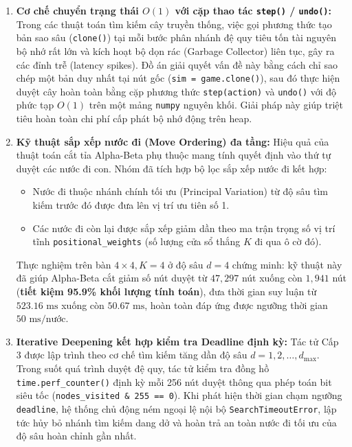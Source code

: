 \documentclass[a4paper,12pt]{report}
\begin{document}
\begin{enumerate}[leftmargin=1.5cm]
    \item \textbf{Cơ chế chuyển trạng thái $O(1)$ với cặp thao tác \texttt{step()} / \texttt{undo()}:}
    Trong các thuật toán tìm kiếm cây truyền thống, việc gọi phương thức tạo bản sao sâu (\texttt{clone()}) tại mỗi bước phân nhánh đệ quy tiêu tốn tài nguyên bộ nhớ rất lớn và kích hoạt bộ dọn rác (Garbage Collector) liên tục, gây ra các đỉnh trễ (latency spikes). Đồ án giải quyết vấn đề này bằng cách chỉ sao chép một bản duy nhất tại nút gốc (\texttt{sim = game.clone()}), sau đó thực hiện duyệt cây hoàn toàn bằng cặp phương thức \texttt{step(action)} và \texttt{undo()} với độ phức tạp $O(1)$ trên một mảng \texttt{numpy} nguyên khối. Giải pháp này giúp triệt tiêu hoàn toàn chi phí cấp phát bộ nhớ động trên heap.

    \item \textbf{Kỹ thuật sắp xếp nước đi (Move Ordering) đa tầng:}
    Hiệu quả của thuật toán cắt tỉa Alpha-Beta phụ thuộc mang tính quyết định vào thứ tự duyệt các nước đi con. Nhóm đã tích hợp bộ lọc sắp xếp nước đi kết hợp:
    \begin{itemize}
        \item Nước đi thuộc nhánh chính tối ưu (Principal Variation) từ độ sâu tìm kiếm trước đó được đưa lên vị trí ưu tiên số 1.
        \item Các nước đi còn lại được sắp xếp giảm dần theo ma trận trọng số vị trí tĩnh \texttt{positional\_weights} (số lượng cửa sổ thắng $K$ đi qua ô cờ đó).
    \end{itemize}
    Thực nghiệm trên bàn $4 \times 4, K=4$ ở độ sâu $d=4$ chứng minh: kỹ thuật này đã giúp Alpha-Beta cắt giảm số nút duyệt từ $47{,}297$ nút xuống còn $1{,}941$ nút (\textbf{tiết kiệm 95.9\% khối lượng tính toán}), đưa thời gian suy luận từ $523.16\text{ ms}$ xuống còn $50.67\text{ ms}$, hoàn toàn đáp ứng được ngưỡng thời gian $50\text{ ms/nước}$.

    \item \textbf{Iterative Deepening kết hợp kiểm tra Deadline định kỳ:}
    Tác tử Cấp 3 được lập trình theo cơ chế tìm kiếm tăng dần độ sâu $d = 1, 2, \dots, d_{\max}$. Trong suốt quá trình duyệt đệ quy, tác tử kiểm tra đồng hồ \texttt{time.\allowbreak perf\_\allowbreak counter()} định kỳ mỗi 256 nút duyệt thông qua phép toán bit siêu tốc (\texttt{nodes\_\allowbreak visited \& 255 == 0}). Khi phát hiện thời gian chạm ngưỡng \texttt{deadline}, hệ thống chủ động ném ngoại lệ nội bộ \texttt{SearchTimeoutError}, lập tức hủy bỏ nhánh tìm kiếm dang dở và hoàn trả an toàn nước đi tối ưu của độ sâu hoàn chỉnh gần nhất.


\end{enumerate}
\end{document}
